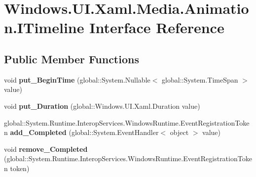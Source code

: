 \hypertarget{interface_windows_1_1_u_i_1_1_xaml_1_1_media_1_1_animation_1_1_i_timeline}{}\section{Windows.\+U\+I.\+Xaml.\+Media.\+Animation.\+I\+Timeline Interface Reference}
\label{interface_windows_1_1_u_i_1_1_xaml_1_1_media_1_1_animation_1_1_i_timeline}
\subsection*{Public Member Functions}
\begin{DoxyCompactItemize}
\item 
\mbox{\label{interface_windows_1_1_u_i_1_1_xaml_1_1_media_1_1_animation_1_1_i_timeline_ad171463dc00462d1c1841261c8e10d1e}} 
void {\bfseries put\+\_\+\+Begin\+Time} (global\+::\+System.\+Nullable$<$ global\+::\+System.\+Time\+Span $>$ value)
\item 
\mbox{\label{interface_windows_1_1_u_i_1_1_xaml_1_1_media_1_1_animation_1_1_i_timeline_aa1793004fef03b01c0341256ede164d9}} 
void {\bfseries put\+\_\+\+Duration} (global\+::\+Windows.\+U\+I.\+Xaml.\+Duration value)
\item 
\mbox{\label{interface_windows_1_1_u_i_1_1_xaml_1_1_media_1_1_animation_1_1_i_timeline_a7ee61c5d3a53c5f8570e743522b52866}} 
global\+::\+System.\+Runtime.\+Interop\+Services.\+Windows\+Runtime.\+Event\+Registration\+Token {\bfseries add\+\_\+\+Completed} (global\+::\+System.\+Event\+Handler$<$ object $>$ value)
\item 
\mbox{\label{interface_windows_1_1_u_i_1_1_xaml_1_1_media_1_1_animation_1_1_i_timeline_a633d5239301849202b3e61b320bed13b}} 
void {\bfseries remove\+\_\+\+Completed} (global\+::\+System.\+Runtime.\+Interop\+Services.\+Windows\+Runtime.\+Event\+Registration\+Token token)
\item 
\mbox{\label{interface_windows_1_1_u_i_1_1_xaml_1_1_media_1_1_animation_1_1_i_timeline_ad171463dc00462d1c1841261c8e10d1e}} 

\end{DoxyCompactItemize}
